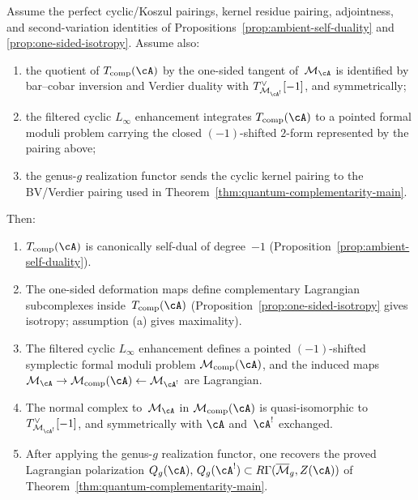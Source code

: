 \begin{theorem}
\label{thm:ambient-complementarity}
Assume the perfect cyclic/Koszul pairings, kernel residue
pairing, adjointness, and second-variation identities of
Propositions~\textup{\ref{prop:ambient-self-duality}} and
\textup{\ref{prop:one-sided-isotropy}}. Assume also:
\begin{enumerate}[label=\textup{(\alph*)}]
\item the quotient of $T_{\mathrm{comp}}(\cA)$ by the
 one-sided tangent of~$\mathcal M_\cA$ is identified by
 bar--cobar inversion and Verdier duality with
 $T_{\mathcal M_{\cA^!}}^\vee[-1]$, and symmetrically;
\item the filtered cyclic $L_\infty$ enhancement integrates
 $T_{\mathrm{comp}}(\cA)$ to a pointed formal moduli problem
 carrying the closed $(-1)$-shifted $2$-form represented by
 the pairing above;
\item the genus-$g$ realization functor sends the cyclic
 kernel pairing to the BV/Verdier pairing used in
 Theorem~\textup{\ref{thm:quantum-complementarity-main}}.
\end{enumerate}
Then:
\begin{enumerate}[label=\textup{(\roman*)}]
\item $T_{\mathrm{comp}}(\cA)$ is canonically self-dual
 of degree~$-1$
 \textup{(}Proposition~\textup{\ref{prop:ambient-self-duality}}\textup{)}.
\item The one-sided deformation maps define complementary
 Lagrangian subcomplexes inside~$T_{\mathrm{comp}}(\cA)$
 \textup{(}Proposition~\textup{\ref{prop:one-sided-isotropy}}
 gives isotropy; assumption \textup{(a)} gives maximality\textup{)}.
\item The filtered cyclic $L_\infty$ enhancement defines a
 pointed $(-1)$-shifted symplectic formal moduli problem
 $\mathcal{M}_{\mathrm{comp}}(\cA)$, and the induced maps
 $\mathcal{M}_\cA \to \mathcal{M}_{\mathrm{comp}}(\cA)
 \leftarrow \mathcal{M}_{\cA^!}$ are Lagrangian.
\item The normal complex to~$\mathcal{M}_\cA$ in
 $\mathcal{M}_{\mathrm{comp}}(\cA)$ is quasi-isomorphic to
 $T_{\mathcal{M}_{\cA^!}}^\vee[-1]$, and symmetrically
 with $\cA$ and~$\cA^!$ exchanged.
\item After applying the genus-$g$ realization functor, one
 recovers the proved Lagrangian polarization
 $Q_g(\cA),\, Q_g(\cA^!)
 \subset R\Gamma(\overline{\mathcal{M}}_g, Z(\cA))$
 of Theorem~\textup{\ref{thm:quantum-complementarity-main}}.
\end{enumerate}
\end{theorem}

